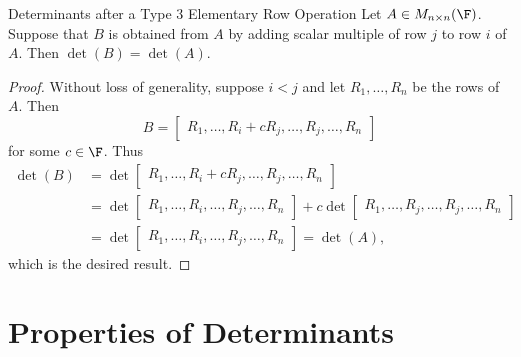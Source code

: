 \documentclass[linearalgebraI]{subfiles}
\begin{document}
    \begin{prop}{Determinants after a Type 3 Elementary Row Operation}
        Let $A\in M_{n\times n}(\F)$. Suppose that $B$ is obtained from $A$ by adding scalar multiple of row $j$ to row $i$ of $A$. Then $\det(B) = \det(A)$.
    \end{prop}

    \begin{proof}
        Without loss of generality, suppose $i < j$ and let $R_1, \ldots, R_n$ be the rows of $A$. Then
        \begin{equation*}
            B = 
            \begin{bmatrix}
                R_1, \ldots, R_i + cR_j, \ldots, R_j, \ldots, R_n
            \end{bmatrix}
        \end{equation*}
        for some $c\in \F$. Thus
        \begin{align*}
            \det(B) & = \det
            \begin{bmatrix}
                R_1, \ldots, R_i+cR_j, \ldots, R_j, \ldots, R_n
            \end{bmatrix} \\
                    & = \det
            \begin{bmatrix}
                R_1, \ldots, R_i, \ldots, R_j, \ldots, R_n
            \end{bmatrix}
            + c \det
            \begin{bmatrix}
                R_1, \ldots, R_j, \ldots, R_j, \ldots, R_n
            \end{bmatrix} \\
                    & = \det
            \begin{bmatrix}
                R_1, \ldots, R_i, \ldots, R_j, \ldots, R_n
            \end{bmatrix}
            = \det(A),
        \end{align*} 
        which is the desired result.
    \end{proof}

    \section{Properties of Determinants}
\end{document}

